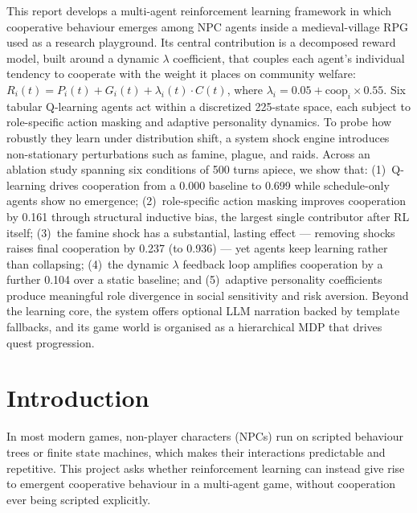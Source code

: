 \documentclass[12pt, a4paper, oneside]{report}
\begin{document}
This report develops a multi-agent reinforcement learning framework in which cooperative behaviour emerges among NPC agents inside a medieval-village RPG used as a research playground. Its central contribution is a decomposed reward model, built around a dynamic $\lambda$ coefficient, that couples each agent's individual tendency to cooperate with the weight it places on community welfare: $R_i(t) = P_i(t) + G_i(t) + \lambda_i(t) \cdot C(t)$, where $\lambda_i = 0.05 + \text{coop}_i \times 0.55$. Six tabular Q-learning agents act within a discretized 225-state space, each subject to role-specific action masking and adaptive personality dynamics. To probe how robustly they learn under distribution shift, a system shock engine introduces non-stationary perturbations such as famine, plague, and raids. Across an ablation study spanning six conditions of 500 turns apiece, we show that: (1)~Q-learning drives cooperation from a 0.000 baseline to 0.699 while schedule-only agents show no emergence; (2)~role-specific action masking improves cooperation by 0.161 through structural inductive bias, the largest single contributor after RL itself; (3)~the famine shock has a substantial, lasting effect --- removing shocks raises final cooperation by 0.237 (to 0.936) --- yet agents keep learning rather than collapsing; (4)~the dynamic $\lambda$ feedback loop amplifies cooperation by a further 0.104 over a static baseline; and (5)~adaptive personality coefficients produce meaningful role divergence in social sensitivity and risk aversion. Beyond the learning core, the system offers optional LLM narration backed by template fallbacks, and its game world is organised as a hierarchical MDP that drives quest progression.

\clearpage
\tableofcontents
\listoffigures
{}
\listoftables
{}

\clearpage
{}
\setcounter{page}{1}

\chapter{Introduction}
\label{chap:introduction}

In most modern games, non-player characters (NPCs) run on scripted behaviour trees or finite state machines, which makes their interactions predictable and repetitive. This project asks whether reinforcement learning can instead give rise to emergent cooperative behaviour in a multi-agent game, without cooperation ever being scripted explicitly.
\end{document}
